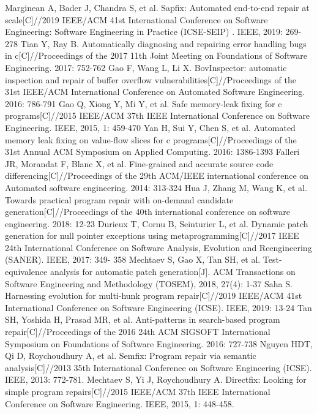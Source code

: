 \begin{thebibliography}{}
	Marginean A, Bader J, Chandra S, et al. Sapfix: Automated end-to-end repair at scale[C]//2019 IEEE/ACM 41st International Conference on Software Engineering: Software Engineering in Practice (ICSE-SEIP) . IEEE, 2019: 269-278
Tian Y, Ray B. Automatically diagnosing and repairing error handling bugs in c[C]//Proceedings of the 2017 11th Joint Meeting on Foundations of Software Engineering. 2017: 752-762
Gao F, Wang L, Li X. BovInspector: automatic inspection and repair of buffer overflow vulnerabilities[C]//Proceedings of the 31st IEEE/ACM International Conference on Automated Software Engineering. 2016: 786-791
Gao Q, Xiong Y, Mi Y, et al. Safe memory-leak fixing for c programs[C]//2015 IEEE/ACM 37th IEEE International Conference on Software Engineering. IEEE, 2015, 1: 459-470
Yan H, Sui Y, Chen S, et al. Automated memory leak fixing on value-flow slices for c programs[C]//Proceedings of the 31st Annual ACM Symposium on Applied Computing. 2016: 1386-1393
Falleri JR, Morandat F, Blanc X, et al. Fine-grained and accurate source code differencing[C]//Proceedings of the 29th ACM/IEEE international conference on Automated software engineering. 2014: 313-324
Hua J, Zhang M, Wang K, et al. Towards practical program repair with on-demand candidate generation[C]//Proceedings of the 40th international conference on software engineering. 2018: 12-23
Durieux T, Cornu B, Seinturier L, et al. Dynamic patch generation for null pointer exceptions using metaprogramming[C]//2017 IEEE 24th International Conference on Software Analysis, Evolution and Reengineering (SANER). IEEE, 2017: 349- 358
Mechtaev S, Gao X, Tan SH, et al. Test-equivalence analysis for automatic patch generation[J]. ACM Transactions on Software Engineering and Methodology (TOSEM), 2018, 27(4): 1-37
Saha S. Harnessing evolution for multi-hunk program repair[C]//2019 IEEE/ACM 41st International Conference on Software Engineering (ICSE). IEEE, 2019: 13-24
Tan SH, Yoshida H, Prasad MR, et al. Anti-patterns in search-based program repair[C]//Proceedings of the 2016 24th ACM SIGSOFT International Symposium on Foundations of Software Engineering. 2016: 727-738
Nguyen HDT, Qi D, Roychoudhury A, et al. Semfix: Program repair via semantic analysis[C]//2013 35th International Conference on Software Engineering (ICSE). IEEE, 2013: 772-781.
Mechtaev S, Yi J, Roychoudhury A. Directfix: Looking for simple program repairs[C]//2015 IEEE/ACM 37th IEEE International Conference on Software Engineering. IEEE, 2015, 1: 448-458.

\end{thebibliography}
